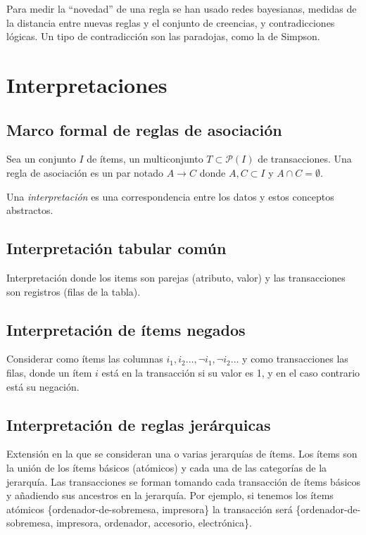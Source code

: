 \documentclass[a4paper,11pt,spanish]{report}
\let\stdsection\section
\let\stdsub\subsection
\let\stdsubsub\subsubsection
\renewcommand{\chapter}{\stdsection}
\renewcommand{\section}{\stdsub}
\renewcommand{\subsection}{\stdsubsub}
\begin{document}
Para medir la ``novedad'' de una regla se han usado redes bayesianas, medidas de la distancia entre nuevas reglas y el conjunto de creencias, y contradicciones lógicas. Un tipo de contradicción son las paradojas, como la de Simpson.

\chapter{Interpretaciones}
\label{sec-4-3}

\section{Marco formal de reglas de asociación}
\label{sec-4-3-1}

Sea un conjunto $I$ de ítems, un multiconjunto $T\subset\mathcal P(I)$ de transacciones. Una regla de asociación es un par notado $A\rightarrow C$ donde $A,C\subset I$ y $A\cap C = \emptyset$.

Una \emph{interpretación} es una correspondencia entre los datos y estos conceptos abstractos.

\section{Interpretación tabular común}
\label{sec-4-3-2}

Interpretación donde los items son parejas (atributo, valor) y las transacciones son registros (filas de la tabla).

\section{Interpretación de ítems negados}
\label{sec-4-3-3}

Considerar como ítems las columnas $i_1,i_2\dots,\neg i_1,\neg i_2\dots$ y como transacciones las filas, donde un ítem $i$ está en la transacción si su valor es 1, y en el caso contrario está su negación.

\section{Interpretación de reglas jerárquicas}
\label{sec-4-3-4}

Extensión en la que se consideran una o varias jerarquías de ítems. Los ítems son la unión de los ítems básicos (atómicos) y cada una de las categorías de la jerarquía. Las transacciones se forman tomando cada transacción de ítems básicos y añadiendo sus ancestros en la jerarquía. Por ejemplo, si tenemos los ítems atómicos \{ordenador-de-sobremesa, impresora\} la transacción será \{ordenador-de-sobremesa, impresora, ordenador, accesorio, electrónica\}.
\end{document}
